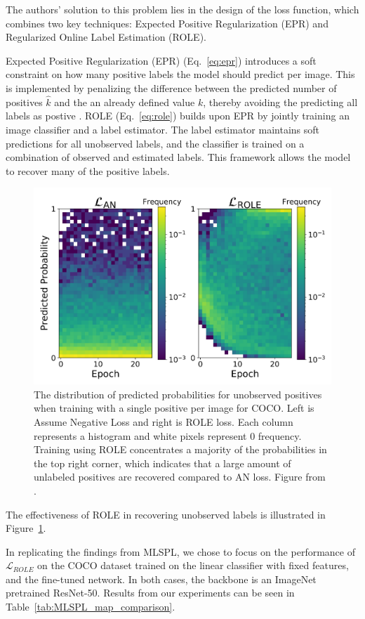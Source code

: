 \documentclass[lettersize,journal]{IEEEtran}
\begin{document}
The authors' solution to this problem lies in the design of the loss function, which combines two key techniques: Expected Positive Regularization (EPR) and Regularized Online Label Estimation (ROLE).

Expected Positive Regularization (EPR) (Eq.~\ref{eq:epr}) introduces a soft constraint on how many positive labels the model should predict per image. This is implemented by penalizing the difference between the predicted number of positives $\hat{k}$ and the an already defined value $k$, thereby avoiding the predicting all labels as postive \cite{mlsp}. ROLE (Eq.~\ref{eq:role}) builds upon EPR by jointly training an image classifier and a label estimator. The label estimator maintains soft predictions for all unobserved labels, and the classifier is trained on a combination of observed and estimated labels. This framework allows the model to recover many of the positive labels.

\begin{figure}[t]
    \centering
    \includegraphics[width=.8\linewidth]{images/mlsp_fig2.png}
    \caption{The distribution of predicted probabilities for unobserved positives when training with a single positive per image for COCO. Left is Assume Negative Loss and right is ROLE loss. Each column represents a histogram and white pixels represent 0 frequency. Training using ROLE concentrates a majority of the probabilities in the top right corner, which indicates that a large amount of unlabeled positives are recovered compared to AN loss. Figure from \cite{mlsp}.}
    \label{fig:mlsp_fig2}
\end{figure}

The effectiveness of ROLE in recovering unobserved labels is illustrated in Figure~\ref{fig:mlsp_fig2}. 

In replicating the findings from MLSPL, we chose to focus on the performance of $\mathcal{L}_{ROLE}$ on the COCO dataset trained on the linear classifier with fixed features, and the fine-tuned network. In both cases, the backbone is an ImageNet pretrained ResNet-50. Results from our experiments can be seen in Table~\ref{tab:MLSPL_map_comparison}.
\end{document}
